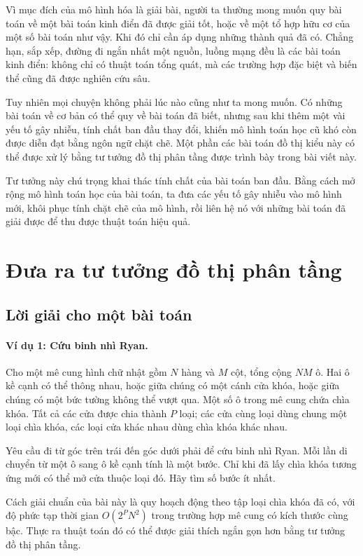 \documentclass[11pt]{article}
\begin{document}
Vì mục đích của mô hình hóa là giải bài, người ta thường mong muốn quy bài
toán về một bài toán kinh điển đã được giải tốt, hoặc về một tổ hợp hữu cơ của
một số bài toán như vậy. Khi đó chỉ cần áp dụng những thành quả đã có. Chẳng
hạn, sắp xếp, đường đi ngắn nhất một nguồn, luồng mạng đều là các bài toán
kinh điển: không chỉ có thuật toán tổng quát, mà các trường hợp đặc biệt và
biến thể cũng đã được nghiên cứu sâu.

Tuy nhiên mọi chuyện không phải lúc nào cũng như ta mong muốn. Có những bài
toán về cơ bản có thể quy về bài toán đã biết, nhưng sau khi thêm một vài yếu
tố gây nhiễu, tính chất ban đầu thay đổi, khiến mô hình toán học cũ khó còn
được diễn đạt bằng ngôn ngữ chặt chẽ. Một phần các bài toán đồ thị kiểu này
có thể được xử lý bằng tư tưởng đồ thị phân tầng được trình bày trong bài
viết này.

Tư tưởng này chú trọng khai thác tính chất của bài toán ban đầu. Bằng cách mở
rộng mô hình toán học của bài toán, ta đưa các yếu tố gây nhiễu vào mô hình
mới, khôi phục tính chặt chẽ của mô hình, rồi liên hệ nó với những bài toán
đã giải được để thu được thuật toán hiệu quả.

\section{Đưa ra tư tưởng đồ thị phân tầng}

\subsection{Lời giải cho một bài toán}

\paragraph{Ví dụ 1: Cứu binh nhì Ryan.}
Cho một mê cung hình chữ nhật gồm $N$ hàng và $M$ cột, tổng cộng $N M$ ô. Hai
ô kề cạnh có thể thông nhau, hoặc giữa chúng có một cánh cửa khóa, hoặc giữa
chúng có một bức tường không thể vượt qua. Một số ô trong mê cung chứa chìa
khóa. Tất cả các cửa được chia thành $P$ loại; các cửa cùng loại dùng chung
một loại chìa khóa, các loại cửa khác nhau dùng chìa khóa khác nhau.

Yêu cầu đi từ góc trên trái đến góc dưới phải để cứu binh nhì Ryan. Mỗi lần
di chuyển từ một ô sang ô kề cạnh tính là một bước. Chỉ khi đã lấy chìa khóa
tương ứng mới có thể mở cửa thuộc loại đó. Hãy tìm số bước ít nhất.

Cách giải chuẩn của bài này là quy hoạch động theo tập loại chìa khóa đã có,
với độ phức tạp thời gian $O(2^P N^2)$ trong trường hợp mê cung có kích thước
cùng bậc. Thực ra thuật toán đó có thể được giải thích ngắn gọn hơn bằng tư
tưởng đồ thị phân tầng.
\end{document}
